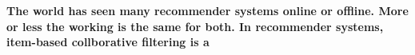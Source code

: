 \begin{center}
\
\paragraph{The world has seen many recommender systems online or offline. More or less the working is the same for both. In recommender systems, item-based collborative filtering is a}
\end{center}

